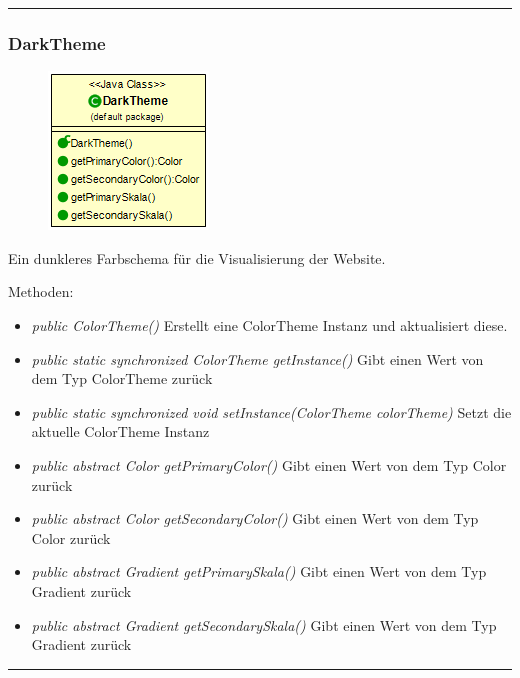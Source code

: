 \rule{\textwidth}{0.4pt}
\subsubsection{DarkTheme}
\begin{minipage}{0.3\textwidth}
    \begin{figure}[H]
        {\centering\includegraphics[scale = 0.5
        ]{media/view/theme/DarkTheme_Class.png}}
    \end{figure}
    \end{minipage} \hfill
    \begin{minipage}{0.6\textwidth}
       Ein dunkleres Farbschema für die Visualisierung der Website.
    \end{minipage}
    \vspace{\baselineskip}
Methoden: \begin{itemize} [noitemsep]
    \item \emph{public ColorTheme()} Erstellt eine ColorTheme Instanz und aktualisiert diese.
    \item \emph{public static synchronized ColorTheme getInstance()} Gibt einen Wert von dem Typ ColorTheme zurück
    \item \emph{public static synchronized void setInstance(ColorTheme colorTheme)} Setzt die aktuelle ColorTheme Instanz
    \item \emph{public abstract Color getPrimaryColor()} Gibt einen Wert von dem Typ Color zurück
    \item \emph{public abstract Color getSecondaryColor()} Gibt einen Wert von dem Typ Color zurück
    \item \emph{public abstract Gradient getPrimarySkala()} Gibt einen Wert von dem Typ Gradient zurück
    \item \emph{public abstract Gradient getSecondarySkala()}  Gibt einen Wert von dem Typ Gradient zurück
\end{itemize}

\rule{\textwidth}{0.4pt}
